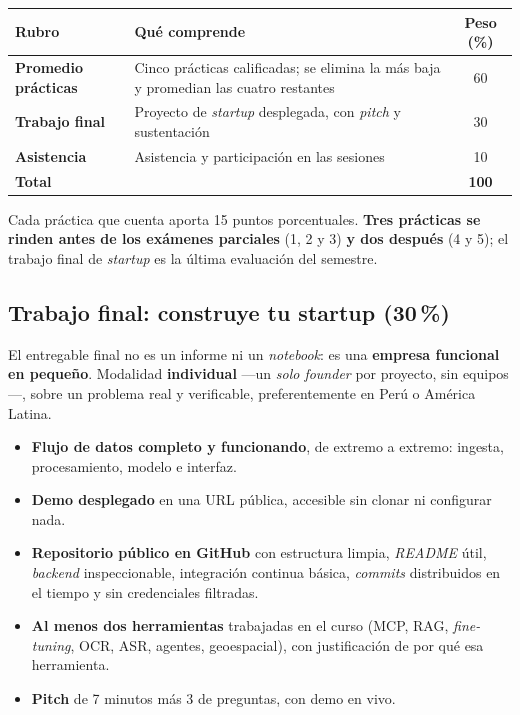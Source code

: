 \documentclass[11pt]{article}
\begin{document}
\begin{center}
\begin{tabularx}{\textwidth}{@{}lXc@{}}
\toprule
\textbf{Rubro} & \textbf{Qu\'e comprende} & \textbf{Peso (\%)} \\
\midrule
\textbf{Promedio pr\'acticas} & Cinco pr\'acticas calificadas; se elimina la m\'as baja y promedian las cuatro restantes & 60 \\
\textbf{Trabajo final} & Proyecto de \emph{startup} desplegada, con \emph{pitch} y sustentaci\'on & 30 \\
\textbf{Asistencia} & Asistencia y participaci\'on en las sesiones & 10 \\
\midrule
\textbf{Total} & & \textbf{100} \\
\bottomrule
\end{tabularx}
\end{center}

Cada pr\'actica que cuenta aporta 15 puntos porcentuales. \textbf{Tres pr\'acticas se rinden antes de los ex\'amenes parciales} (1, 2 y 3) \textbf{y dos despu\'es} (4 y 5); el trabajo final de \emph{startup} es la \'ultima evaluaci\'on del semestre.

\subsection*{Trabajo final: construye tu startup (30\,\%)}

El entregable final no es un informe ni un \emph{notebook}: es una \textbf{empresa funcional en peque\~no}. Modalidad \textbf{individual} ---un \emph{solo founder} por proyecto, sin equipos---, sobre un problema real y verificable, preferentemente en Per\'u o Am\'erica Latina.

\begin{itemize}
\item \textbf{Flujo de datos completo y funcionando}, de extremo a extremo: ingesta, procesamiento, modelo e interfaz.
\item \textbf{Demo desplegado} en una URL p\'ublica, accesible sin clonar ni configurar nada.
\item \textbf{Repositorio p\'ublico en GitHub} con estructura limpia, \emph{README} \'util, \emph{backend} inspeccionable, integraci\'on continua b\'asica, \emph{commits} distribuidos en el tiempo y sin credenciales filtradas.
\item \textbf{Al menos dos herramientas} trabajadas en el curso (MCP, RAG, \emph{fine-tuning}, OCR, ASR, agentes, geoespacial), con justificaci\'on de por qu\'e esa herramienta.
\item \textbf{Pitch} de 7 minutos m\'as 3 de preguntas, con demo en vivo.
\end{itemize}
\end{document}
